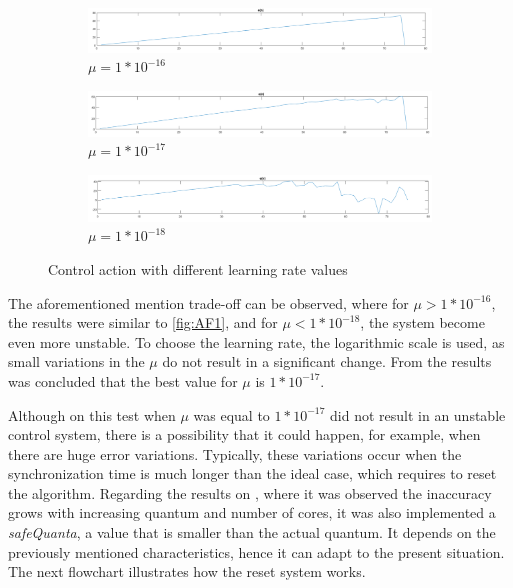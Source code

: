 \begin{figure}
\centering
\begin{subfigure}{\textwidth}
    \includegraphics[width=\textwidth]{Images/AF1.png}
    \caption{ $\mu = 1 * 10^{-16} $ }
    \label{fig:AF1}
\end{subfigure}
\begin{subfigure}{\textwidth}
    \includegraphics[width=\textwidth]{Images/AF2.png}
    \caption{ $\mu = 1 * 10^{-17}$ }
    \label{fig:AF2}
\end{subfigure}
\begin{subfigure}{\textwidth}
    \includegraphics[width=\textwidth]{Images/AF3.png}
    \caption{ $\mu = 1 * 10^{-18}$ }
    \label{fig:AF3}
\end{subfigure}
        
\caption{Control action with different learning rate values}
\label{fig:learningRateTests}
\end{figure}

 The aforementioned mention trade-off can be observed, where for $\mu > 1 * 10^{-16} $, the results were similar to \autoref{fig:AF1}, and for $\mu < 1 * 10^{-18} $, the system become even more unstable. To choose the learning rate, the logarithmic scale is used, as small variations in the $\mu$ do not result in a significant change. From the results was concluded that the best value for $\mu$ is $1 * 10^{-17}$. 

Although on this test when $\mu$ was equal to $1 * 10^{-17}$ did not result in an unstable control system, there is a possibility that it could happen, for example, when there are huge error variations. Typically, these variations occur when the synchronization time is much longer than the ideal case, which requires to reset the algorithm. Regarding the results on \cite{pargem5}, where it was observed the inaccuracy grows with increasing quantum and number of cores, it was also implemented a \textit{safeQuanta}, a value that is smaller than the actual quantum. It depends on the previously mentioned characteristics, hence it can adapt to the present situation. The next flowchart illustrates how the reset system works.

